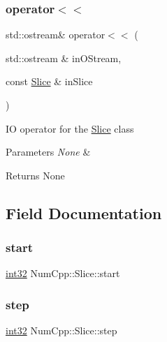 \subsubsection{\texorpdfstring{operator$<$$<$}{operator<<}}
{\footnotesize\ttfamily std\+::ostream\& operator$<$$<$ (\begin{DoxyParamCaption}\item[{std\+::ostream \&}]{in\+O\+Stream,  }\item[{const \mbox{\hyperlink{class_num_cpp_1_1_slice}{Slice}} \&}]{in\+Slice }\end{DoxyParamCaption})\hspace{0.3cm}{\ttfamily [friend]}}

IO operator for the \mbox{\hyperlink{class_num_cpp_1_1_slice}{Slice}} class


\begin{DoxyParams}{Parameters}
{\em None} & \\
\hline
\end{DoxyParams}
\begin{DoxyReturn}{Returns}
None 
\end{DoxyReturn}


\subsection{Field Documentation}
\mbox{\label{class_num_cpp_1_1_slice_a2b304f62d107e09756fdebf45029d333}} 
\subsubsection{\texorpdfstring{start}{start}}
{\footnotesize\ttfamily \mbox{\hyperlink{namespace_num_cpp_acf3eb1592f8b248ff0a236634864633c}{int32}} Num\+Cpp\+::\+Slice\+::start}

\mbox{\label{class_num_cpp_1_1_slice_a7a20894f3625159ed878124664887aff}} 
\subsubsection{\texorpdfstring{step}{step}}
{\footnotesize\ttfamily \mbox{\hyperlink{namespace_num_cpp_acf3eb1592f8b248ff0a236634864633c}{int32}} Num\+Cpp\+::\+Slice\+::step}


